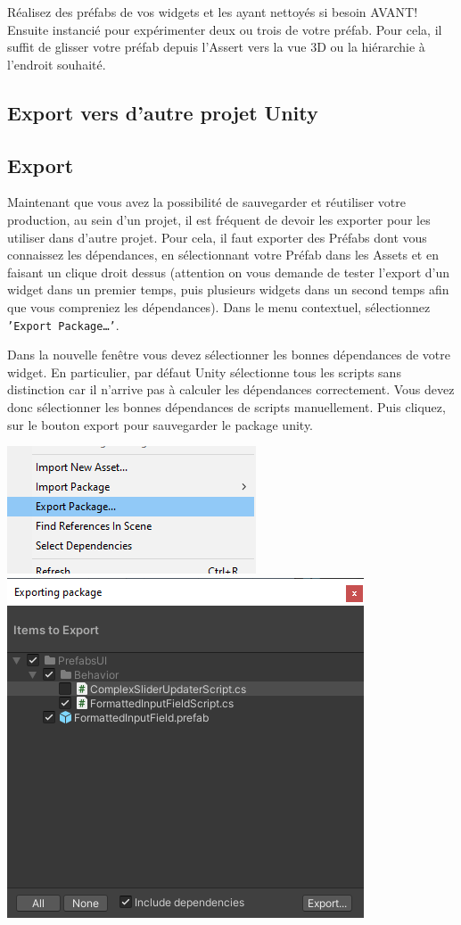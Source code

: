 \documentclass[a4paper,10pt]{article}
\begin{document}
Réalisez des préfabs de vos widgets et les ayant nettoyés si besoin AVANT! Ensuite instancié pour expérimenter deux ou trois de votre préfab. Pour cela, il suffit de glisser votre préfab depuis l'Assert vers la vue 3D ou la hiérarchie à l'endroit souhaité.

\subsection{Export vers d'autre projet Unity}

\subsection{Export}

Maintenant que vous avez la possibilité de sauvegarder et réutiliser votre production, au sein d'un projet, il est fréquent de devoir les exporter pour les utiliser dans d'autre projet. 
Pour cela, il faut exporter des Préfabs dont vous connaissez les dépendances, en sélectionnant votre Préfab dans les Assets et en faisant un clique droit dessus (attention on vous demande de tester l'export d'un widget dans un premier temps, puis plusieurs widgets dans un second temps afin que vous compreniez les dépendances). Dans le menu contextuel, sélectionnez \texttt{'Export Package\ldots'}.

Dans la nouvelle fenêtre vous devez sélectionner les bonnes dépendances de votre widget. En particulier, par défaut Unity sélectionne tous les scripts sans distinction car il n'arrive pas à calculer les dépendances correctement. Vous devez donc sélectionner les bonnes dépendances de scripts manuellement. Puis cliquez, sur le bouton export pour sauvegarder le package unity.

\begin{center}
\hfill \includegraphics[width=0.35\linewidth]{rc/unity_set_ui_export_package}
\hfill \includegraphics[width=0.5\linewidth]{rc/unity_set_ui_export_prefab_deps}
\hfill 
\end{center}
\end{document}
